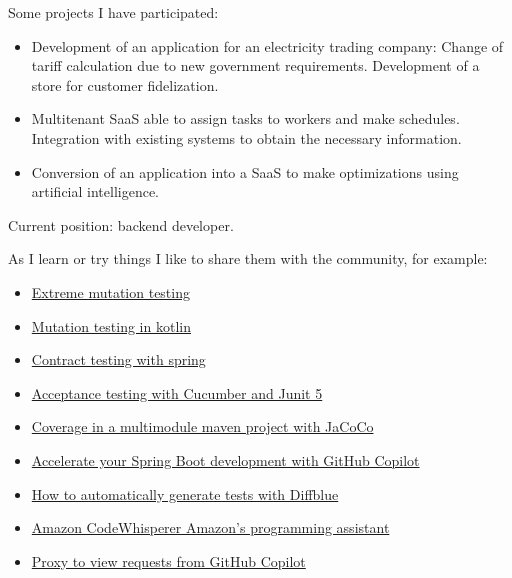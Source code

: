 \documentclass[a4paper]{article}
\begin{document}
Some projects I have participated:

\begin{itemize} \itemsep 1pt

\item Development of an application for an electricity trading company: Change of tariff calculation due to new government requirements. Development of a store for customer fidelization.
\item Multitenant SaaS able to assign tasks to workers and make schedules. Integration with existing systems to obtain the necessary information.
\item Conversion of an application into a SaaS to make optimizations using artificial intelligence.
\end{itemize}

Current position: backend developer.

As I learn or try things I like to share them with the community, for example:

\begin{itemize} \itemsep 1pt

\item \href{https://www.adictosaltrabajo.com/2021/08/24/extreme-mutation-testing}{Extreme mutation testing}
\item \href{https://www.adictosaltrabajo.com/2022/02/14/mutation-testing-en-kotlin}{Mutation testing in kotlin}
\item \href{https://www.adictosaltrabajo.com/2022/07/21/contract-testing-con-spring}{Contract testing with spring}
\item \href{https://www.adictosaltrabajo.com/2022/09/06/tests-de-aceptacion-con-cucumber-y-junit-5}{Acceptance testing with Cucumber and Junit 5}
\item \href{https://www.adictosaltrabajo.com/2022/10/10/cobertura-en-un-proyecto-maven-multimodulo-con-jacoco}{Coverage in a multimodule maven project with JaCoCo}
\item \href{https://www.adictosaltrabajo.com/2023/05/11/acelera-tu-desarrollo-en-spring-boot-con-github-copilot}{Accelerate your Spring Boot development with GitHub Copilot}
\item \href{https://www.adictosaltrabajo.com/2023/05/18/como-generar-tests-automaticamente-con-diffblue}{How to automatically generate tests with Diffblue}
\item \href{https://www.adictosaltrabajo.com/2023/05/24/amazon-codewhisperer-el-asistente-de-programacion-de-amazon}{Amazon CodeWhisperer Amazon's programming assistant}
\item \href{https://www.adictosaltrabajo.com/2023/05/29/proxy-para-ver-las-peticiones-de-github-copilot}{Proxy to view requests from GitHub Copilot}
\end{itemize}
\end{document}
